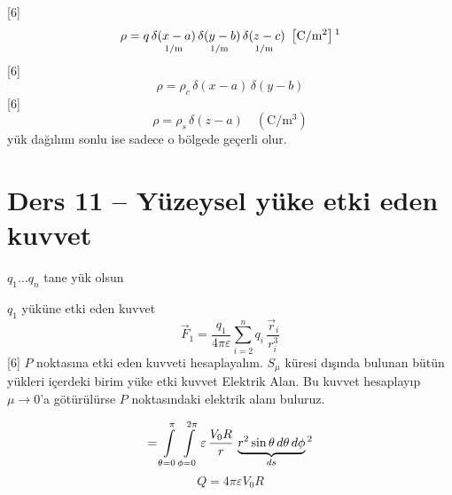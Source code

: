 \documentclass[11pt,a4paper]{article}
\begin{document}
[6]
\[ \rho=q\,\underset{1/\mathrm{m}}{\delta(x-a)}\,\underset{1/\mathrm{m}}{\delta(y-b)}\,\underset{1/\mathrm{m}}{\delta(z-c)}\ \left[\mathrm{C/m^2}\right]\text{\footnotemark} \]
[6]
\[ \rho=\rho_c\,\delta(x-a)\,\delta(y-b) \]
[6]
\[ \rho=\rho_s\,\delta(z-a)\quad(\mathrm{C/m^3}) \]
yük dağılımı sonlu ise sadece o bölgede geçerli olur.

\section{Ders 11 -- Yüzeysel yüke etki eden kuvvet}
$q_1\ldots q_n$ tane yük olsun

$q_1$ yüküne etki eden kuvvet
\[ \vec F_1=\frac{q_1}{4\pi\varepsilon}\sum_{i=2}^{n}q_i\,\frac{\vec r_i}{r_i^3} \]
[6]
$P$ noktasına etki eden kuvveti hesaplayalım. $S_\mu$ küresi dışında bulunan bütün yükleri içerdeki birim yüke etki kuvvet Elektrik Alan. Bu kuvvet hesaplayıp $\mu\to0$'a götürülürse $P$ noktasındaki elektrik alanı buluruz.

\[ =\int\limits_{\theta=0}^{\pi}\int\limits_{\phi=0}^{2\pi}\varepsilon\,\frac{V_0R}{r}\,\underbrace{r^2\sin\theta\,d\theta\,d\phi}_{ds}\text{\footnotemark} \]
\[ Q=4\pi\varepsilon V_0R \]
\begin{center}
\end{center}
\end{document}

